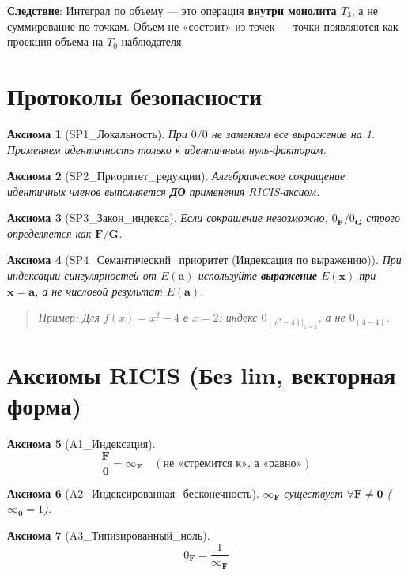 \documentclass[12pt]{article}
\newtheorem{axiom}{Аксиома}
\newcommand{\0}{\mathbf{0}}
\newcommand{\1}{\mathds{1}}
\newcommand{\bx}{\mathbf{x}}
\newcommand{\bF}{\mathbf{F}}
\newcommand{\bG}{\mathbf{G}}
\begin{document}
\textbf{Следствие}: Интеграл по объему --- это операция \textbf{внутри монолита $T_3$}, а не суммирование по точкам. Объем не «состоит» из точек --- точки появляются как проекция объема на $T_0$-наблюдателя.

\section{Протоколы безопасности}

\begin{axiom}[SP1\_Локальность]
При $0/0$ не заменяем все выражение на 1. Применяем идентичность только к идентичным нуль-факторам.
\end{axiom}

\begin{axiom}[SP2\_Приоритет\_редукции]
Алгебраическое сокращение идентичных членов выполняется \textbf{ДО} применения RICIS-аксиом.
\end{axiom}

\begin{axiom}[SP3\_Закон\_индекса]
Если сокращение невозможно, $0_{\bF}/0_{\bG}$ строго определяется как $\bF/\bG$.
\end{axiom}

\begin{axiom}[SP4\_Семантический\_приоритет (Индексация по выражению)]
При индексации сингулярностей от $E(\mathbf{a})$ используйте \textbf{выражение} $E(\bx)$ при $\bx=\mathbf{a}$, а не числовой результат $E(\mathbf{a})$.
\begin{quote}
\textit{Пример}: Для $f(x)=x^2-4$ в $x=2$: индекс $0_{(x^2-4)|_{x=2}}$, а не $0_{(4-4)}$.
\end{quote}
\end{axiom}

\section{Аксиомы RICIS (Без lim, векторная форма)}

\begin{axiom}[A1\_Индексация]
\[
\frac{\bF}{\0} = \infty_{\bF} \quad (\text{не «стремится к», а «равно»})
\]
\end{axiom}

\begin{axiom}[A2\_Индексированная\_бесконечность]
$\infty_{\bF}$ существует $\forall \bF\neq\0$ ($\infty_{\0}=1$).
\end{axiom}

\begin{axiom}[A3\_Типизированный\_ноль]
\[
0_{\bF} = \frac{1}{\infty_{\bF}}
\]
\end{axiom}
\end{document}
